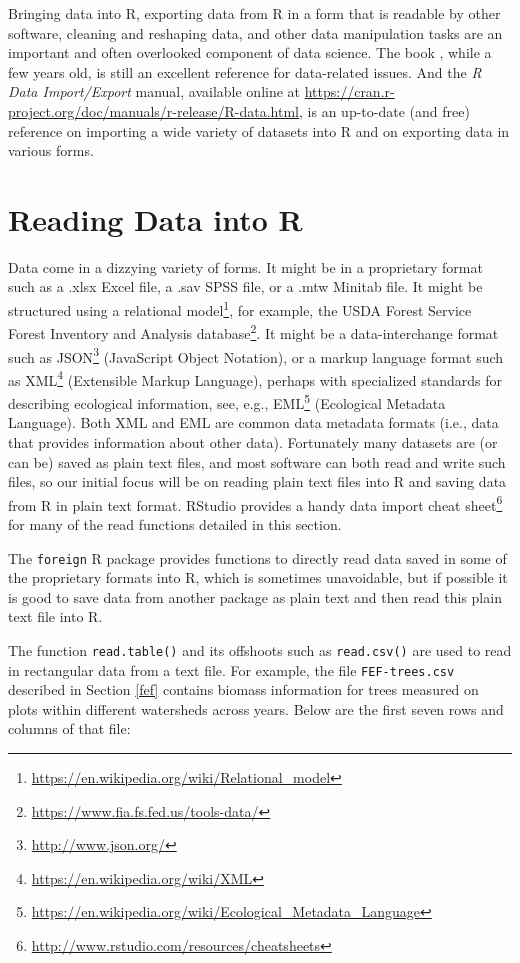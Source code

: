 \documentclass[]{krantz}
\renewcommand{\href}[2]{#2\footnote{\url{#1}}}
\begin{document}
Bringing data into R, exporting data from R in a form that is readable by other software, cleaning and reshaping data, and other data manipulation tasks are an important and often overlooked component of data science. The book \citet{SpectorDataManipulation}, while a few years old, is still an excellent reference for data-related issues. And the \emph{R Data Import/Export} manual, available online at \url{https://cran.r-project.org/doc/manuals/r-release/R-data.html}, is an up-to-date (and free) reference on importing a wide variety of datasets into R and on exporting data in various forms.

\hypertarget{reading-data-into-r}{%
\section{Reading Data into R}\label{reading-data-into-r}}

Data come in a dizzying variety of forms. It might be in a proprietary format such as a .xlsx Excel file, a .sav SPSS file, or a .mtw Minitab file. It might be structured using a \href{https://en.wikipedia.org/wiki/Relational_model}{relational model}, for example, the USDA Forest Service \href{https://www.fia.fs.fed.us/tools-data/}{Forest Inventory and Analysis database}. It might be a data-interchange format such as \href{http://www.json.org/}{JSON} (JavaScript Object Notation), or a markup language format such as \href{https://en.wikipedia.org/wiki/XML}{XML} (Extensible Markup Language), perhaps with specialized standards for describing ecological information, see, e.g., \href{https://en.wikipedia.org/wiki/Ecological_Metadata_Language}{EML} (Ecological Metadata Language). Both XML and EML are common data metadata formats (i.e., data that provides information about other data). Fortunately many datasets are (or can be) saved as plain text files, and most software can both read and write such files, so our initial focus will be on reading plain text files into R and saving data from R in plain text format. RStudio provides a handy \href{http://www.rstudio.com/resources/cheatsheets}{data import cheat sheet} for many of the read functions detailed in this section.

The \texttt{foreign} R package provides functions to directly read data saved in some of the proprietary formats into R, which is sometimes unavoidable, but if possible it is good to save data from another package as plain text and then read this plain text file into R.

The function \texttt{read.table()} and its offshoots such as \texttt{read.csv()} are used to read in rectangular data from a text file. For example, the file \texttt{FEF-trees.csv} described in Section \ref{fef} contains biomass information for trees measured on plots within different watersheds across years. Below are the first seven rows and columns of that file:
\end{document}
